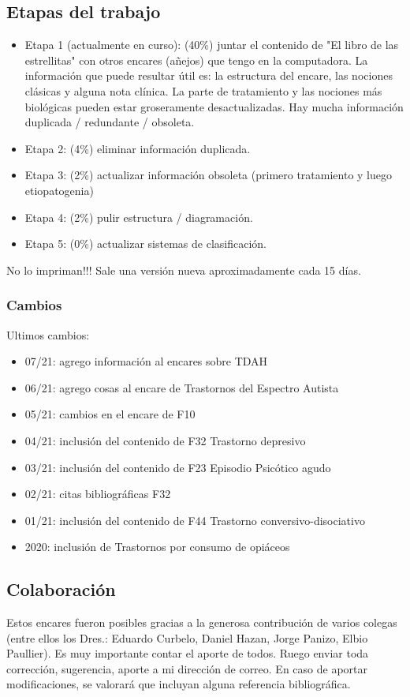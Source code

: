 \subsection*{Etapas del trabajo}
\begin{itemize}
\item Etapa 1 (actualmente en curso): \faBatteryHalf (40\%) juntar el contenido de "El libro de las estrellitas" con otros encares (añejos) que tengo en la computadora. La información que puede resultar útil es: la estructura del encare, las nociones clásicas y alguna nota clínica. La parte de tratamiento y las nociones más biológicas pueden estar groseramente desactualizadas. Hay mucha información duplicada / redundante / obsoleta.
\item Etapa 2: \faBatteryEmpty (4\%) eliminar información duplicada.
\item Etapa 3: \faBatteryEmpty (2\%) actualizar información obsoleta (primero tratamiento y luego etiopatogenia)
\item Etapa 4: \faBatteryEmpty (2\%) pulir estructura / diagramación.
\item Etapa 5: \faBatteryEmpty (0\%) actualizar sistemas de clasificación.
\end{itemize}
\faStop No lo impriman!!! Sale una versión nueva aproximadamente cada 15 días.
\subsubsection*{Cambios}
Ultimos cambios:
\begin{itemize}
\item 07/21: agrego información al encares sobre TDAH
\item 06/21: agrego cosas al encare de Trastornos del Espectro Autista
\item 05/21: cambios en el encare de F10
\item 04/21: inclusión del contenido de F32 Trastorno depresivo
\item 03/21: inclusión del contenido de F23 Episodio Psicótico agudo
\item 02/21: citas bibliográficas F32
\item 01/21: inclusión del contenido de F44 Trastorno conversivo-disociativo
\item 2020: inclusión de Trastornos por consumo de opiáceos
\end{itemize}
\subsection*{Colaboración}
Estos encares fueron posibles gracias a la generosa contribución de varios colegas (entre ellos los Dres.: Eduardo Curbelo, Daniel Hazan, Jorge Panizo, Elbio Paullier). Es muy importante contar el aporte de todos. Ruego enviar toda corrección, sugerencia, aporte a mi dirección de correo. En caso de aportar modificaciones, se valorará que incluyan alguna referencia bibliográfica.
